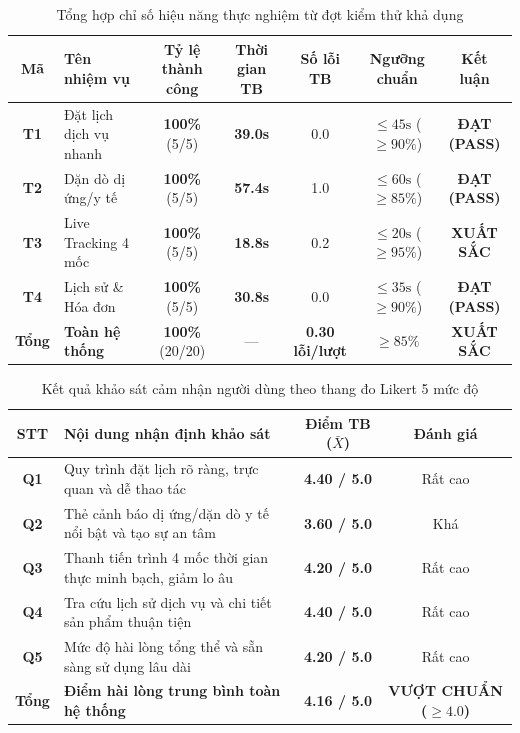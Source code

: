 \begin{table}[H]
  \centering
  \footnotesize
  \begin{tabularx}{\textwidth}{|c|X|c|c|c|c|c|}
    \hline
    \textbf{Mã} & \textbf{Tên nhiệm vụ} & \textbf{Tỷ lệ thành công} & \textbf{Thời gian TB} & \textbf{Số lỗi TB} & \textbf{Ngưỡng chuẩn} & \textbf{Kết luận} \\ \hline
    \textbf{T1} & Đặt lịch dịch vụ nhanh & \textbf{100\%} (5/5) & \textbf{39.0s} & 0.0 & $\le 45\text{s}$ ($\ge 90\%$) & \textbf{ĐẠT (PASS)} \\ \hline
    \textbf{T2} & Dặn dò dị ứng/y tế & \textbf{100\%} (5/5) & \textbf{57.4s} & 1.0 & $\le 60\text{s}$ ($\ge 85\%$) & \textbf{ĐẠT (PASS)} \\ \hline
    \textbf{T3} & Live Tracking 4 mốc & \textbf{100\%} (5/5) & \textbf{18.8s} & 0.2 & $\le 20\text{s}$ ($\ge 95\%$) & \textbf{XUẤT SẮC} \\ \hline
    \textbf{T4} & Lịch sử \& Hóa đơn & \textbf{100\%} (5/5) & \textbf{30.8s} & 0.0 & $\le 35\text{s}$ ($\ge 90\%$) & \textbf{ĐẠT (PASS)} \\ \hline
    \textbf{Tổng} & \textbf{Toàn hệ thống} & \textbf{100\%} (20/20) & --- & \textbf{0.30 lỗi/lượt} & $\ge 85\%$ & \textbf{XUẤT SẮC} \\ \hline
  \end{tabularx}
  \caption{Tổng hợp chỉ số hiệu năng thực nghiệm từ đợt kiểm thử khả dụng}
  \label{tab:test_performance_results}
\end{table}

\begin{table}[H]
  \centering
  \small
  \begin{tabularx}{\textwidth}{|c|X|c|c|}
    \hline
    \textbf{STT} & \textbf{Nội dung nhận định khảo sát} & \textbf{Điểm TB ($\bar{X}$)} & \textbf{Đánh giá} \\ \hline
    \textbf{Q1} & Quy trình đặt lịch rõ ràng, trực quan và dễ thao tác & \textbf{4.40 / 5.0} & Rất cao \\ \hline
    \textbf{Q2} & Thẻ cảnh báo dị ứng/dặn dò y tế nổi bật và tạo sự an tâm & \textbf{3.60 / 5.0} & Khá \\ \hline
    \textbf{Q3} & Thanh tiến trình 4 mốc thời gian thực minh bạch, giảm lo âu & \textbf{4.20 / 5.0} & Rất cao \\ \hline
    \textbf{Q4} & Tra cứu lịch sử dịch vụ và chi tiết sản phẩm thuận tiện & \textbf{4.40 / 5.0} & Rất cao \\ \hline
    \textbf{Q5} & Mức độ hài lòng tổng thể và sẵn sàng sử dụng lâu dài & \textbf{4.20 / 5.0} & Rất cao \\ \hline
    \textbf{Tổng} & \textbf{Điểm hài lòng trung bình toàn hệ thống} & \textbf{4.16 / 5.0} & \textbf{VƯỢT CHUẨN ($\ge 4.0$)} \\ \hline
  \end{tabularx}
  \caption{Kết quả khảo sát cảm nhận người dùng theo thang đo Likert 5 mức độ}
  \label{tab:test_likert_results}
\end{table}

